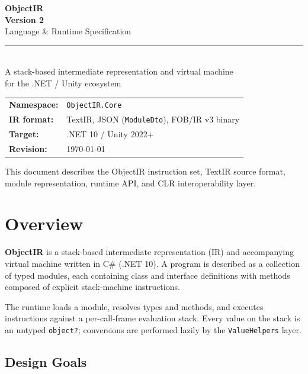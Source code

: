 \documentclass[11pt,a4paper]{article}
\newcommand{\code}[1]{\texttt{\small #1}}
\newcommand{\typename}[1]{\textcolor{typecolor}{\texttt{\small #1}}}
\begin{document}
\begin{titlepage}
  \centering
  \vspace*{3cm}
  {\Huge\bfseries ObjectIR}\\[0.5em]
  {\large\bfseries Version 2}\\[0.8em]
  {\Large Language \& Runtime Specification}\\[2.5em]
  \rule{0.55\linewidth}{0.4pt}\\[1.2em]
  {\normalsize
    A stack-based intermediate representation and virtual machine\\[0.3em]
    for the .NET / Unity ecosystem
  }\\[2.5em]
  \begin{tabular}{ll}
    \textbf{Namespace:}  & \texttt{ObjectIR.Core} \\[0.2em]
    \textbf{IR format:}  & TextIR, JSON (\texttt{ModuleDto}), FOB/IR v3 binary \\[0.2em]
    \textbf{Target:}     & .NET 10 / Unity 2022+ \\[0.2em]
    \textbf{Revision:}   & \today \\
  \end{tabular}
  \vfill
  {\small This document describes the ObjectIR instruction set, TextIR source
  format, module representation, runtime API, and CLR interoperability layer.}
\end{titlepage}

\tableofcontents
\newpage

\section{Overview}

\textbf{ObjectIR} is a stack-based intermediate representation (IR) and
accompanying virtual machine written in C\# (.NET 10). A program is described
as a collection of typed modules, each containing class and interface
definitions with methods composed of explicit stack-machine instructions.

The runtime loads a module, resolves types and methods, and executes
instructions against a per-call-frame evaluation stack. Every value on the
stack is an untyped \code{object?}; conversions are performed lazily by the
\typename{ValueHelpers} layer.

\subsection{Design Goals}
\end{document}
